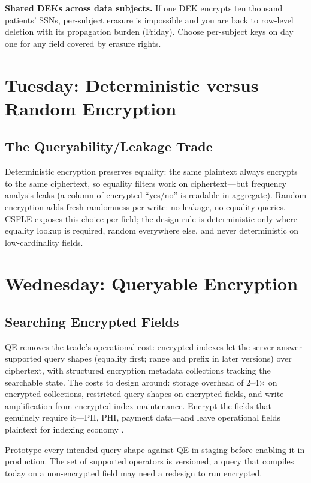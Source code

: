 \begin{pitfall}
\textbf{Shared DEKs across data subjects.} If one DEK encrypts ten thousand patients' SSNs, per-subject erasure is impossible and you are back to row-level deletion with its propagation burden (Friday). Choose per-subject keys on day one for any field covered by erasure rights.
\end{pitfall}

\section{Tuesday: Deterministic versus Random Encryption}
\subsection{The Queryability/Leakage Trade}
Deterministic encryption preserves equality: the same plaintext always encrypts to the same ciphertext, so equality filters work on ciphertext---but frequency analysis leaks (a column of encrypted ``yes/no'' is readable in aggregate). Random encryption adds fresh randomness per write: no leakage, no equality queries. CSFLE exposes this choice per field; the design rule is deterministic only where equality lookup is required, random everywhere else, and never deterministic on low-cardinality fields.

\section{Wednesday: Queryable Encryption}
\subsection{Searching Encrypted Fields}
QE removes the trade's operational cost: encrypted indexes let the server answer supported query shapes (equality first; range and prefix in later versions) over ciphertext, with structured encryption metadata collections tracking the searchable state. The costs to design around: storage overhead of 2--4$\times$ on encrypted collections, restricted query shapes on encrypted fields, and write amplification from encrypted-index maintenance. Encrypt the fields that genuinely require it---PII, PHI, payment data---and leave operational fields plaintext for indexing economy \cite{mongodbQueryableEncryptionDocs}.

\begin{tipbox}
Prototype every intended query shape against QE in staging before enabling it in production. The set of supported operators is versioned; a query that compiles today on a non-encrypted field may need a redesign to run encrypted.
\end{tipbox}

